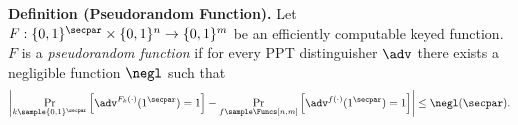 \textbf{Definition (Pseudorandom Function).}
Let $F : \{0,1\}^\secpar \times \{0,1\}^n \to \{0,1\}^m$ be an efficiently
computable keyed function. $F$ is a \emph{pseudorandom function} if for every
PPT distinguisher $\adv$ there exists a negligible function $\negl$ such that
\[
\left| \Pr_{k \sample \{0,1\}^\secpar}\left[ \adv^{F_k(\cdot)}(1^\secpar) = 1 \right]
- \Pr_{f \sample \Funcs[n,m]}\left[ \adv^{f(\cdot)}(1^\secpar) = 1 \right] \right|
\le \negl(\secpar).
\]
